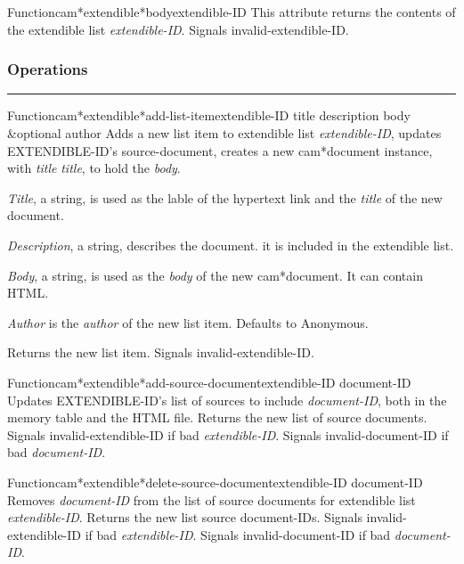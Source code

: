 \begin{functiondoc}{Function}{cam*extendible*body}{extendible-ID}
This attribute returns the contents of the extendible list {\em extendible-ID}.
Signals invalid-extendible-ID.
\end{functiondoc}


\subsubsection*{Operations}
\par\vspace*{0.00in}\par\hrule\par\medskip\par


\begin{functiondoc}{Function}{cam*extendible*add-list-item}{extendible-ID title description body \&optional author}
Adds a new list item to extendible list {\em extendible-ID}, updates EXTENDIBLE-ID's
source-document, creates a new cam*document instance, with {\em title} {\em title}, to 
hold the {\em body}.

{\em Title}, a string, is used as the lable of the hypertext link and the {\em title} of the 
 new document.

{\em Description}, a string, describes the document. it is included in the extendible list.

{\em Body}, a string, is used as the {\em body} of the new cam*document.  It can contain HTML.

{\em Author} is the {\em author} of the new list item.  Defaults to Anonymous.

Returns the new list item.
Signals invalid-extendible-ID.
\end{functiondoc}

\begin{functiondoc}{Function}{cam*extendible*add-source-document}{extendible-ID document-ID}
Updates EXTENDIBLE-ID's list of sources to include {\em document-ID}, both in the 
memory table and the HTML file.
Returns the new list of source documents.
Signals invalid-extendible-ID if bad {\em extendible-ID}.
Signals invalid-document-ID if bad {\em document-ID}.
\end{functiondoc}

\begin{functiondoc}{Function}{cam*extendible*delete-source-document}{extendible-ID document-ID}
Removes {\em document-ID} from the list of source documents for extendible list
{\em extendible-ID}.
Returns the new list source document-IDs.
Signals invalid-extendible-ID if bad {\em extendible-ID}.
Signals invalid-document-ID if bad {\em document-ID}.
\end{functiondoc}

